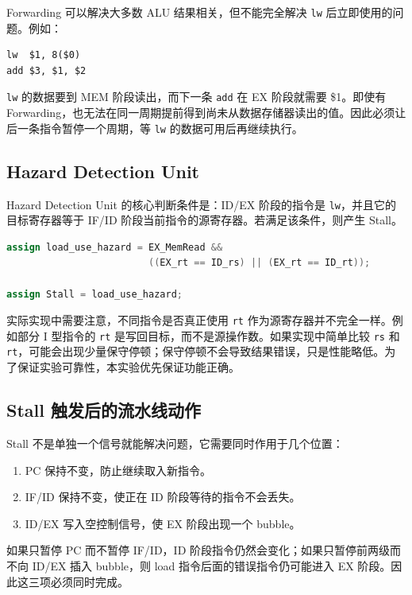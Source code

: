 \documentclass[UTF8,zihao=-4]{ctexart}
\begin{document}
Forwarding 可以解决大多数 ALU 结果相关，但不能完全解决 \texttt{lw} 后立即使用的问题。例如：

\begin{lstlisting}[language={}]
lw  $1, 8($0)
add $3, $1, $2
\end{lstlisting}

\texttt{lw} 的数据要到 MEM 阶段读出，而下一条 \texttt{add} 在 EX 阶段就需要 \$1。即使有 Forwarding，也无法在同一周期提前得到尚未从数据存储器读出的值。因此必须让后一条指令暂停一个周期，等 \texttt{lw} 的数据可用后再继续执行。

\subsection{Hazard Detection Unit}

Hazard Detection Unit 的核心判断条件是：ID/EX 阶段的指令是 \texttt{lw}，并且它的目标寄存器等于 IF/ID 阶段当前指令的源寄存器。若满足该条件，则产生 Stall。

\begin{lstlisting}[language=Verilog]
assign load_use_hazard = EX_MemRead &&
                         ((EX_rt == ID_rs) || (EX_rt == ID_rt));

assign Stall = load_use_hazard;
\end{lstlisting}

实际实现中需要注意，不同指令是否真正使用 \texttt{rt} 作为源寄存器并不完全一样。例如部分 I 型指令的 \texttt{rt} 是写回目标，而不是源操作数。如果实现中简单比较 \texttt{rs} 和 \texttt{rt}，可能会出现少量保守停顿；保守停顿不会导致结果错误，只是性能略低。为了保证实验可靠性，本实验优先保证功能正确。

\subsection{Stall 触发后的流水线动作}

Stall 不是单独一个信号就能解决问题，它需要同时作用于几个位置：

\begin{enumerate}[label=\arabic*.]
  \item PC 保持不变，防止继续取入新指令。
  \item IF/ID 保持不变，使正在 ID 阶段等待的指令不会丢失。
  \item ID/EX 写入空控制信号，使 EX 阶段出现一个 bubble。
\end{enumerate}

如果只暂停 PC 而不暂停 IF/ID，ID 阶段指令仍然会变化；如果只暂停前两级而不向 ID/EX 插入 bubble，则 load 指令后面的错误指令仍可能进入 EX 阶段。因此这三项必须同时完成。
\end{document}

